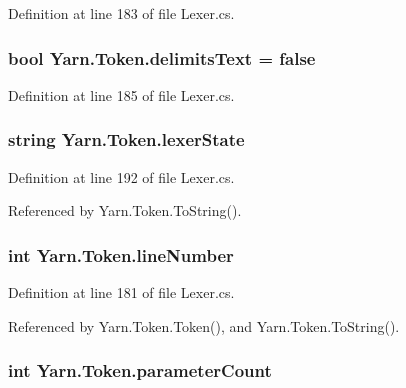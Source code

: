 Definition at line 183 of file Lexer.\-cs.

\hypertarget{a00163_af15d26fa4e6f276ab58ff66d3c4203da}{
\subsubsection[{delimits\-Text}]{\setlength{\rightskip}{0pt plus 5cm}bool Yarn.\-Token.\-delimits\-Text = false}}\label{a00163_af15d26fa4e6f276ab58ff66d3c4203da}


Definition at line 185 of file Lexer.\-cs.

\hypertarget{a00163_a710099e7abe84f30864a320cc7464214}{
\subsubsection[{lexer\-State}]{\setlength{\rightskip}{0pt plus 5cm}string Yarn.\-Token.\-lexer\-State}}\label{a00163_a710099e7abe84f30864a320cc7464214}


Definition at line 192 of file Lexer.\-cs.



Referenced by Yarn.\-Token.\-To\-String().

\hypertarget{a00163_a80fe710713201bb793a41452e314a721}{
\subsubsection[{line\-Number}]{\setlength{\rightskip}{0pt plus 5cm}int Yarn.\-Token.\-line\-Number}}\label{a00163_a80fe710713201bb793a41452e314a721}


Definition at line 181 of file Lexer.\-cs.



Referenced by Yarn.\-Token.\-Token(), and Yarn.\-Token.\-To\-String().

\hypertarget{a00163_adf11c0d29b66935a8d8109d6308d0488}{
\subsubsection[{parameter\-Count}]{\setlength{\rightskip}{0pt plus 5cm}int Yarn.\-Token.\-parameter\-Count}}\label{a00163_adf11c0d29b66935a8d8109d6308d0488}


